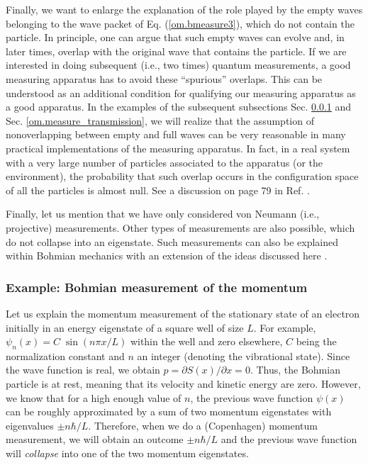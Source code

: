 \documentclass[onecolumn,nofootinbib, secnumarabic, amsmath, nobibnotes,11pt,aps,pra]{revtex4-1}
\newcommand{\sref}[1]{Sec. \ref{#1}}
\newcommand{\eref}[1]{Eq. (\ref{#1})}
\begin{document}
Finally, we want to enlarge the explanation of the role played by the empty waves belonging to the wave packet of \eref{om.bmeasure3}, which do not contain the particle. In principle, one can argue that such empty waves can evolve and, in later times, overlap with the original wave that contains the particle. If we are interested in doing subsequent (i.e., two times) quantum measurements, a good measuring apparatus has to avoid these ``spurious'' overlaps. This can be understood as an additional condition for qualifying our measuring apparatus as a good apparatus. In the examples of the subsequent subsections \sref{om.measure_moment} and \sref{om.measure_transmission}, we will realize that the assumption of nonoverlapping between empty and full waves can be very reasonable in many practical implementations of the measuring apparatus. In fact, in a real system with a very large number of particles associated to the apparatus (or the environment), the probability that such overlap occurs in the configuration space of all the particles is almost null. See a discussion on page 79 in Ref. \cite{om.bomhhiley1993}.

Finally, let us mention that we have only considered von Neumann
(i.e., projective) measurements. Other types of measurements are
also possible, which do not collapse into an eigenstate. Such
measurements can also be explained within Bohmian mechanics with an
extension of the ideas discussed here
\cite{om.bomhhiley1993,om.Durrnaive,om.Durrllibre}.

\subsubsection{Example: Bohmian measurement of the momentum}
\label{om.measure_moment}

Let us explain the momentum measurement of the stationary state of
an electron initially in an energy eigenstate of a square well of
size $L$. For example, $\psi_n(x) = C \; \sin(n \pi x/L)$ within the
well and zero elsewhere, $C$ being the normalization constant and
$n$ an integer (denoting the vibrational state). Since the wave
function is real, we obtain $p = \partial S(x)/\partial x = 0$.
Thus, the Bohmian particle is at rest, meaning that its velocity and
kinetic energy are zero. However, we know that for a high enough
value of $n$, the previous wave function $\psi(x)$ can be roughly
approximated by a sum of two momentum eigenstates with eigenvalues
$\pm n \hbar/L$. Therefore, when we do a (Copenhagen) momentum
measurement, we will obtain an outcome $\pm n \hbar/L$ and the
previous wave function will \textit{collapse} into one of the two
momentum eigenstates.
\end{document}
